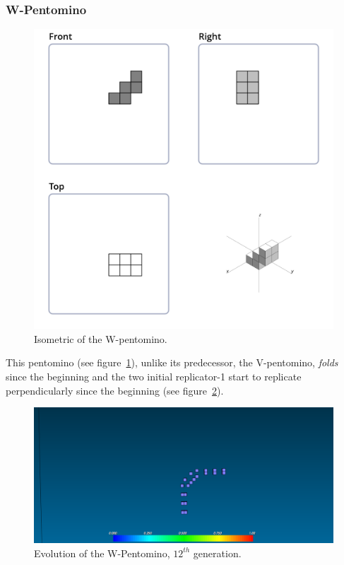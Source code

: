 \subsubsection{W-Pentomino}
\label{sec:w-pentomino}

\begin{figure}[H]
	\centering
	\includegraphics[scale=0.3]{iso_diagrams/w.png}
	\caption{Isometric of the W-pentomino.}
	\label{fig:iso-pent-w}
\end{figure}

This pentomino (see figure~\ref{fig:iso-pent-w}), unlike its predecessor, the
V-pentomino, \textit{folds} since the beginning and the two initial replicator-1
start to replicate perpendicularly since the beginning  (see
figure~\ref{fig:ss-pent:w-12}).

\begin{figure}[H]
	\centering
	\includegraphics[scale=0.3]{pentominoes_ss/w_12.png}
	\caption{Evolution of the W-Pentomino, $12^{th}$ generation.}
	\label{fig:ss-pent:w-12}
\end{figure}

